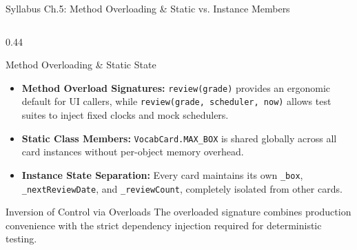 ﻿\documentclass[aspectratio=169,10pt,t]{beamer}
\begin{document}
\begin{frame}[fragile]{Syllabus Ch.5: Method Overloading \& Static vs. Instance Members}
\begin{columns}[T,onlytextwidth]
    \begin{column}{0.44\textwidth}
      \begin{infoCard}{Method Overloading \& Static State}
        \begin{itemize}\setlength{\itemsep}{1.2pt}\setlength{\parskip}{0pt}\setlength{\leftmargini}{7pt}
          \item \textbf{Method Overload Signatures:} \texttt{review(grade)} provides an ergonomic default for UI callers, while \lstinline|review(grade, scheduler, now)| allows test suites to inject fixed clocks and mock schedulers.
          \item \textbf{Static Class Members:} \texttt{VocabCard.MAX\_BOX} is shared globally across all card instances without per-object memory overhead.
          \item \textbf{Instance State Separation:} Every card maintains its own \texttt{\_box}, \texttt{\_nextReviewDate}, and \texttt{\_reviewCount}, completely isolated from other cards.
        \end{itemize}
      \end{infoCard}
      \vspace{1mm}
      \begin{hlCard}{Inversion of Control via Overloads}
        \fontsize{5.4pt}{6.4pt}\selectfont
        The overloaded signature combines production convenience with the strict dependency injection required for deterministic testing.
      \end{hlCard}
    \end{column}
  \end{columns}
\end{frame}
\end{document}
